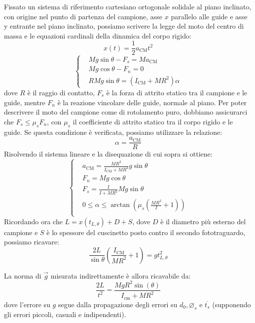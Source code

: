 \documentclass{article}
\newcommand*{\diam}{\varnothing}
\begin{document}
Fissato un sistema di riferimento cartesiano ortogonale solidale
al piano inclinato, con origine nel punto di partenza del campione,
asse $x$ parallelo alle guide e asse y entrante nel piano inclinato,
possiamo scrivere la legge del moto del centro di massa e le
equazioni cardinali della dinamica del corpo rigido:
\[x(t) = \frac{1}{2} a_\text{CM} t^2\]
\[\left\{\begin{aligned}
    &M g \sin\theta - F_s = M a_\text{CM} \\
    &M g \cos\theta - F_n = 0 \\
    &R M g \sin\theta = \left(I_\text{CM} + M R^2\right) \alpha
\end{aligned}\right.\]
dove $R$ è il raggio di contatto, $F_s$ è la forza di attrito statico
tra il campione e le guide, mentre $F_n$ è la reazione vincolare delle
guide, normale al piano.
Per poter descrivere il moto del campione come di rotolamento puro,
dobbiamo assicurarci che $F_s \le \mu_s F_n$, con $\mu_s$ il
coefficiente di attrito statico tra il corpo rigido e le guide.
Se questa condizione è verificata, possiamo utilizzare la relazione:
\[\alpha = \frac{a_\text{CM}}{R}\]
Risolvendo il sistema lineare e la disequazione di cui sopra si ottiene:
\[\left\{\begin{aligned}
    &a_\text{CM} = \frac{M R^2}{I_\text{CM} + M R^2} g\sin\theta \\
    &F_n = M g \cos\theta \\
    &F_s = \frac{I}{I + M R^2} M g \sin\theta \\
    & 0 \le \alpha \le \arctan\left(\mu_s \left(\frac{MR^2}{I} + 1\right)\right) \\
\end{aligned}\right.\]
Ricordando ora che $L = x(t_{L,\theta}) + D + S$, dove $D$ è il diametro
più esterno del campione e $S$ è lo spessore del cuscinetto posto contro
il secondo fototraguardo, possiamo ricavare:
\[
    \frac{2 L}{\sin\theta}\left(\frac{I_\text{CM}}{M R^2} + 1\right) = g t^2_{L,\theta}
\]

La norma di $\vec{g}$ misurata indirettamente è allora ricavabile da:
\[\frac{2 L}{t^2} = \frac{M g R^2 \sin(\theta)}{I_\text{cm} + MR^2}\]
dove l'errore su $g$ segue dalla propagazione degli errori su $d_0,\diam_s$ e
$\overline{t_s}$ (supponendo gli errori piccoli, casuali e indipendenti). %
\end{document}
